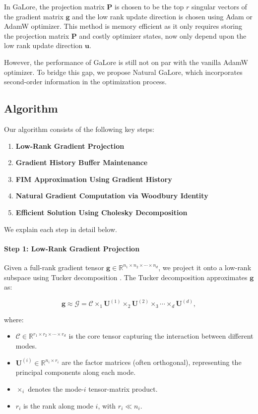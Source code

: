 In GaLore, the projection matrix $\mathbf{P}$ is chosen to be the top $r$ singular vectors of the gradient matrix $\mathbf{g}$ and the low rank update direction is chosen using Adam or AdamW optimizer. This method is memory efficient as it only requires storing the projection matrix $\mathbf{P}$ and costly optimizer states, now only depend upon the low rank update direction $\mathbf{u}$.

However, the performance of GaLore is still not on par with the vanilla AdamW optimizer. To bridge this gap, we propose Natural GaLore, which incorporates second-order information in the optimization process.

\subsection{Algorithm}

Our algorithm consists of the following key steps:

\begin{enumerate}
    \item \textbf{Low-Rank Gradient Projection}
    \item \textbf{Gradient History Buffer Maintenance}
    \item \textbf{FIM Approximation Using Gradient History}
    \item \textbf{Natural Gradient Computation via Woodbury Identity}
    \item \textbf{Efficient Solution Using Cholesky Decomposition}
\end{enumerate}

We explain each step in detail below.

\paragraph{Step 1: Low-Rank Gradient Projection}



Given a full-rank gradient tensor $\mathbf{g} \in \mathbb{R}^{n_1 \times n_2 \times \cdots \times n_d}$, we project it onto a low-rank subspace using Tucker decomposition \citep{tuckerMathematicalNotesThree1966}. The Tucker decomposition approximates $\mathbf{g}$ as:

\[
\mathbf{g} \approx \mathcal{G} = \mathcal{C} \times_1 \mathbf{U}^{(1)} \times_2 \mathbf{U}^{(2)} \times_3 \cdots \times_d \mathbf{U}^{(d)},
\]

where:

\begin{itemize}
    \item $\mathcal{C} \in \mathbb{R}^{r_1 \times r_2 \times \cdots \times r_d}$ is the core tensor capturing the interaction between different modes.
    \item $\mathbf{U}^{(i)} \in \mathbb{R}^{n_i \times r_i}$ are the factor matrices (often orthogonal), representing the principal components along each mode.
    \item $\times_i$ denotes the mode-$i$ tensor-matrix product.
    \item $r_i$ is the rank along mode $i$, with $r_i \ll n_i$.
\end{itemize}

